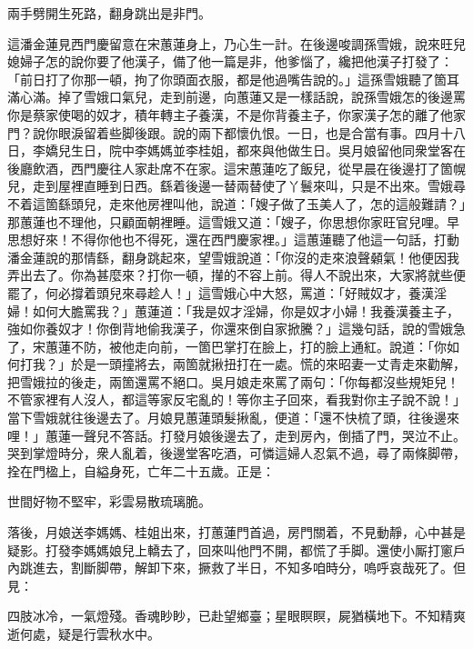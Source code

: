 \begin{myquote}
兩手劈開生死路，翻身跳出是非門。
\end{myquote}

這潘金蓮見西門慶留意在宋蕙蓮身上，乃心生一計。在後邊唆調孫雪娥，說來旺兒媳婦子怎的說你要了他漢子，備了他一篇是非，他爹惱了，纔把他漢子打發了：「前日打了你那一頓，拘了你頭面衣服，都是他過嘴告說的。」這孫雪娥聽了箇耳滿心滿。掉了雪娥口氣兒，走到前邊，向蕙蓮又是一樣話說，說孫雪娥怎的後邊罵你是蔡家使喝的奴才，積年轉主子養漢，不是你背養主子，你家漢子怎的離了他家門？說你眼淚留着些脚後跟。說的兩下都懷仇恨。一日，也是合當有事。四月十八日，李嬌兒生日，院中李媽媽並李桂姐，都來與他做生日。吳月娘留他同衆堂客在後廳飲酒，西門慶往人家赴席不在家。這宋蕙蓮吃了飯兒，從早晨在後邊打了箇幌兒，走到屋裡直睡到日西。繇着後邊一替兩替使了丫鬟來叫，只是不出來。雪娥尋不着這箇繇頭兒，走來他房裡叫他，說道：「嫂子做了玉美人了，怎的這般難請？」那蕙蓮也不理他，只顧面朝裡睡。這雪娥又道：「嫂子，你思想你家旺官兒哩。早思想好來！不得你他也不得死，還在西門慶家裡。」{}這蕙蓮聽了他這一句話，打動潘金蓮說的那情繇，翻身跳起來，望雪娥說道：「你沒的走來浪聲顙氣！他便因我弄出去了。你為甚麼來？打你一頓，攆的不容上前。得人不說出來，大家將就些便罷了，何必撐着頭兒來尋趁人！」這雪娥心中大怒，罵道：「好賊奴才，養漢淫婦！如何大膽罵我？」蕙蓮道：「我是奴才淫婦，你是奴才小婦！我養漢養主子，強如你養奴才！{}你倒背地偷我漢子，你還來倒自家掀騰？」這幾句話，說的雪娥急了，宋蕙蓮不防，被他走向前，一箇巴掌打在臉上，打的臉上通紅。說道：「你如何打我？」於是一頭撞將去，兩箇就揪扭打在一處。慌的來昭妻一丈青走來勸解，把雪娥拉的後走，兩箇還罵不絕口。吳月娘走來罵了兩句：「你每都沒些規矩兒！不管家裡有人沒人，都這等家反宅亂的！等你主子回來，看我對你主子說不說！」當下雪娥就往後邊去了。月娘見蕙蓮頭髮揪亂，便道：「還不快梳了頭，往後邊來哩！」蕙蓮一聲兒不答話。打發月娘後邊去了，走到房內，倒插了門，哭泣不止。哭到掌燈時分，衆人亂着，後邊堂客吃酒，可憐這婦人忍氣不過，{}尋了兩條脚帶，拴在門楹上，自縊身死，亡年二十五歲。正是：

\begin{myquote}
世間好物不堅牢，彩雲易散琉璃脆。
\end{myquote}

落後，月娘送李媽媽、桂姐出來，打蕙蓮門首過，房門關着，不見動靜，心中甚是疑影。打發李媽媽娘兒上轎去了，回來叫他門不開，都慌了手脚。還使小厮打窻戶內跳進去，割斷脚帶，解卸下來，撅救了半日，不知多咱時分，嗚呼哀哉死了。但見：

\begin{myquote}
四肢冰冷，一氣燈殘。香魂眇眇，已赴望鄉臺；星眼瞑瞑，屍猶橫地下。不知精爽逝何處，疑是行雲秋水中。
\end{myquote}

